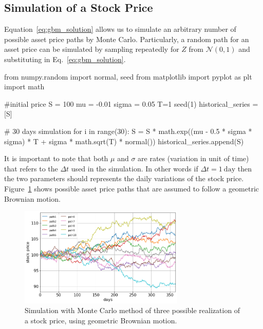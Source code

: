 \subsection{Simulation of a Stock Price}

Equation~\ref{eq:gbm_solution} allows us to simulate an arbitrary number of possible asset price paths by Monte Carlo. Particularly, a random path for an asset price can be simulated by sampling repeatedly for $Z$ from $\mathcal{N}(0,1)$ and substituting in Eq.~\ref{eq:gbm_solution}. 

\begin{ipython}
from numpy.random import normal, seed
from matplotlib import pyplot as plt
import math

#initial price
S = 100
mu = -0.01
sigma = 0.05
T=1
seed(1)
historical_series = [S]

# 30 days simulation
for i in range(30):
    S = S * math.exp((mu - 0.5 * sigma * sigma) * T +
                      sigma * math.sqrt(T) * normal())
    historical_series.append(S)
\end{ipython}

It is important to note that both $\mu$ and $\sigma$ are rates (variation in unit of time) that refers to the $\Delta t$ used in the simulation. In other words if $\Delta t = 1~\textrm{day}$ then the two parameters should represents the daily variations of the stock price. Figure~\ref{fig:stock_price_sim} shows possible asset price paths that are assumed to follow a geometric Brownian motion. 

\begin{figure}[htb]
	\centering
	\includegraphics[width=0.7\textwidth]{figures/asset_price_simulation}
	\caption{Simulation with Monte Carlo method of three possible realization of a stock price, using geometric Brownian motion.}
	\label{fig:stock_price_sim}
\end{figure}

